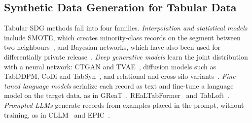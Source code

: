 \documentclass[conference]{IEEEtran}
\begin{document}
\subsection{Synthetic Data Generation for Tabular Data}
Tabular SDG methods fall into four families. \emph{Interpolation and statistical models} include SMOTE, which creates minority-class records on the segment between two neighbours~\cite{chawla2002smote}, and Bayesian networks, which have also been used for differentially private release~\cite{zhang2014privbayes}. \emph{Deep generative models} learn the joint distribution with a neural network: CTGAN and TVAE~\cite{xu2019ctgan}, diffusion models such as TabDDPM, CoDi and TabSyn~\cite{kotelnikov2023tabddpm,lee2023codi,zhang2024tabsyn}, and relational and cross-silo variants~\cite{fan2020relational,shankar2024silofuse}. \emph{Fine-tuned language models} serialize each record as text and fine-tune a language model on the target data, as in GReaT~\cite{borisov2023great}, REaLTabFormer~\cite{solatorio2023realtabformer} and TabLoft~\cite{chen2026tabloft}. \emph{Prompted LLMs} generate records from examples placed in the prompt, without training, as in CLLM~\cite{seedat2024cllm} and EPIC~\cite{kim2024epic}.
\end{document}
